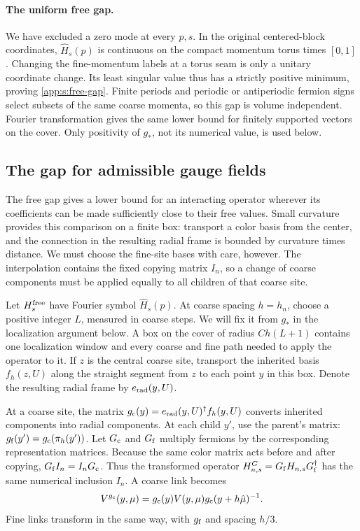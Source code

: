 \documentclass[11pt,a4paper]{article}
\theoremstyle{remark}
\begin{document}
\paragraph{The uniform free gap.}
We have excluded a zero mode at every $p,s$. In the original
centered-block coordinates, $\widehat H_s(p)$ is continuous on the
compact momentum torus times $[0,1]$. Changing the fine-momentum
labels at a torus seam is only a unitary coordinate change. Its least
singular value thus has a strictly positive minimum, proving
\eqref{app:s:free-gap}. Finite periods and periodic or antiperiodic
fermion signs select subsets of the same coarse momenta, so this gap is
volume independent. Fourier transformation gives the same lower bound
for finitely supported vectors on the cover. Only positivity of $g_*$,
not its numerical value, is used below.

\subsection{The gap for admissible gauge fields}
\label{app:s:local-comparison}
\label{app:s:supported}

The free gap gives a lower bound for an interacting operator wherever its
coefficients can be made sufficiently close to their free values. Small curvature
provides this comparison on a finite box: transport a color basis from
the center, and the connection in the resulting radial frame is bounded
by curvature times distance. We must choose the fine-site bases with
care, however. The interpolation contains the fixed copying matrix
$I_n$, so a change of coarse components must be applied equally to
all children of that coarse site.

Let $H_s^{\rm free}$ have Fourier symbol $\widehat H_s(p)$.
At coarse spacing $h=h_n$, choose a positive integer $L$, measured
in coarse steps. We will fix it from $g_*$ in the localization
argument below. A box on the cover of radius $Ch(L+1)$ contains
one localization window and every coarse and fine path needed to
apply the operator to it. If $z$ is the central coarse site, transport
the inherited basis $f_h(z,U)$ along the straight segment from $z$
to each point $y$ in this box. Denote the resulting radial frame by
$e_{\rm rad}(y,U)$.

At a coarse site, the matrix
$g_{\rm c}(y)=e_{\rm rad}(y,U)^\dagger f_h(y,U)$ converts
inherited components into radial components. At each child $y'$,
use the parent's matrix:
$g_{\rm f}(y')=g_{\rm c}(\pi_h(y'))$. Let
$G_{\rm c}$ and $G_{\rm f}$ multiply fermions by the corresponding
representation matrices. Because the same color matrix acts before and
after copying, $G_{\rm f}I_n=I_nG_{\rm c}$. Thus the transformed
operator $H_{n,s}^G=G_{\rm f}H_{n,s}G_{\rm f}^\dagger$ has the
same numerical inclusion $I_n$. A coarse link becomes
\begin{equation}
 V^{g_{\rm c}}(y,\mu)
   =g_{\rm c}(y)V(y,\mu)g_{\rm c}(y+h\hat\mu)^{-1}.
\end{equation}
Fine links transform in the same way, with $g_{\rm f}$ and spacing
$h/3$.
\end{document}
